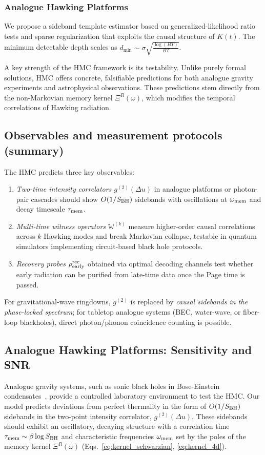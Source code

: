 \documentclass[aps,prd,preprint,onecolumn,superscriptaddress,nofootinbib,longbibliography,floatfix,11pt,showpacs,showkeys]{revtex4-2}
\newcommand{\HMC}{\textsc{HMC}\xspace}
\theoremstyle{plain}
\theoremstyle{definition}
\theoremstyle{remark}
\begin{document}
\subsubsection{Analogue Hawking Platforms}
We propose a sideband template estimator based on generalized-likelihood ratio tests and sparse regularization that exploits the causal structure of $K(t)$. The minimum detectable depth scales as $d_{\mathrm{min}}\sim \sigma \sqrt{\frac{\log(BT)}{BT}}$. 



A key strength of the \HMC{} framework is its testability. Unlike purely formal solutions, \HMC{} offers concrete, falsifiable predictions for both analogue gravity experiments and astrophysical observations. These predictions stem directly from the non-Markovian memory kernel $\Xi^R(\omega)$, which modifies the temporal correlations of Hawking radiation.

\subsection{Observables and measurement protocols (summary)}
The \HMC{} predicts three key observables:
\begin{enumerate}[label=(\roman*)]
\item \emph{Two-time intensity correlators $g^{(2)}(\Delta u)$} in analogue platforms or photon-pair cascades should show $O(1/S_{\rm BH})$ sidebands with oscillations at $\omega_{\rm mem}$ and decay timescale $\tau_{\rm mem}$.
\item \emph{Multi-time witness operators $\mathbb{W}^{(k)}$} measure higher-order causal correlations across $k$ Hawking modes and break Markovian collapse, testable in quantum simulators implementing circuit-based black hole protocols.
\item \emph{Recovery probes $\rho^{\rm rec}_{\rm early}$} obtained via optimal decoding channels test whether early radiation can be purified from late-time data once the Page time is passed.
\end{enumerate}
For gravitational-wave ringdowns, $g^{(2)}$ is replaced by \emph{causal sidebands in the phase-locked spectrum}; for tabletop analogue systems (BEC, water-wave, or fiber-loop blackholes), direct photon/phonon coincidence counting is possible.

\subsection{Analogue Hawking Platforms: Sensitivity and SNR}
Analogue gravity systems, such as sonic black holes in Bose-Einstein condensates~\cite{Barcelo:2011, Steinhauer:2016}, provide a controlled laboratory environment to test the \HMC{}. Our model predicts deviations from perfect thermality in the form of $O(1/S_{\rm BH})$ sidebands in the two-point intensity correlator, $g^{(2)}(\Delta u)$. These sidebands should exhibit an oscillatory, decaying structure with a correlation time $\tau_{\rm mem}\sim \beta \log S_{\rm BH}$ and characteristic frequencies $\omega_{\rm mem}$ set by the poles of the memory kernel $\Xi^R(\omega)$ (Eqs.~\ref{eq:kernel_schwarzian}, \ref{eq:kernel_4d}).
\end{document}
